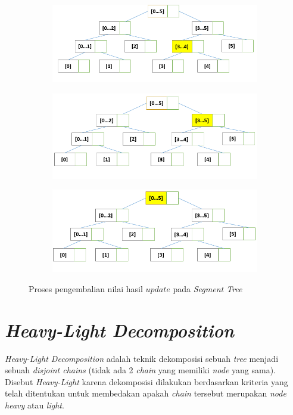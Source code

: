 \begin{figure}[H]
	\begin{subfigure}{.5\textwidth}
		\centering
		\includegraphics[scale=0.3]{assets/images/Update_ST_5.PNG}
		\caption{}
		\label{fig:subupdateST5}
	\end{subfigure}
	\begin{subfigure}{.5\textwidth}
		\centering
		\includegraphics[scale=0.3]{assets/images/Update_ST_6.PNG}
		\caption{}
		\label{fig:subupdateST6}
	\end{subfigure}
	\begin{subfigure}{1.0\textwidth}
		\centering
		\includegraphics[scale=0.3]{assets/images/Update_ST_7.PNG}
		\caption{}
		\label{fig:subupdateST7}
	\end{subfigure}
	\caption{Proses pengembalian nilai hasil \textit{$update$} pada \textit{Segment Tree}}
	\label{fig:updateST2}
\end{figure}
\section{\quad \textit{Heavy-Light Decomposition}}
\quad\textit{Heavy-Light Decomposition} adalah teknik dekomposisi sebuah \textit{tree} menjadi sebuah \textit{disjoint chains} (tidak ada 2 \textit{chain} yang memiliki \textit{node} yang sama). Disebut \textit{Heavy-Light} karena dekomposisi dilakukan berdasarkan kriteria yang telah ditentukan untuk membedakan apakah \textit{chain} tersebut merupakan \textit{node heavy} atau \textit{light}.

